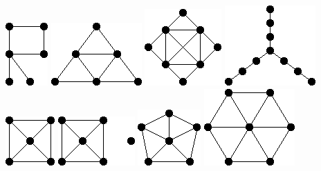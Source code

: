 \documentclass[11pt,paper=b5,footinclude,headinclude]{scrbook} %
\theoremstyle{remark}
\theoremstyle{definition} %
\theoremstyle{theorem} %
\begin{document}
\includegraphics[scale=0.5,frame]{smallGraphs/g_R.png}     
\includegraphics[scale=0.5,frame]{smallGraphs/g_S3.png}     
\includegraphics[scale=0.5,frame]{smallGraphs/g_S4.png}     
\includegraphics[scale=0.5,frame]{smallGraphs/g_T3.png}     
\includegraphics[scale=0.5,frame]{smallGraphs/g_W4.png}     
\includegraphics[scale=0.5,frame]{smallGraphs/g_W4UK1.png}     
\includegraphics[scale=0.5,frame]{smallGraphs/g_W5.png}     
\includegraphics[scale=0.5,frame]{smallGraphs/g_W6.png}     
\end{document}
